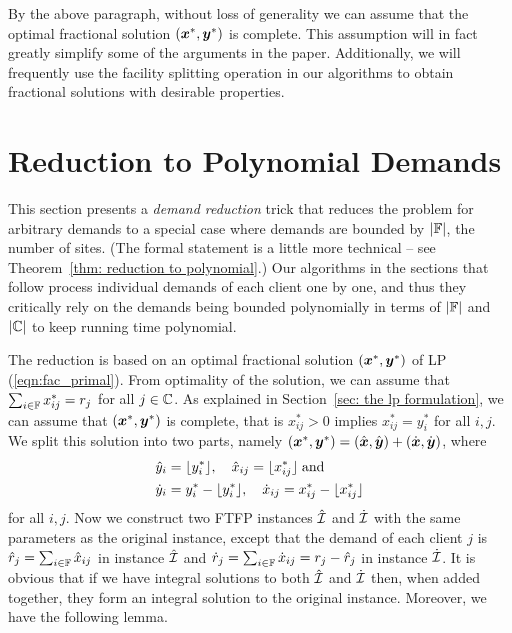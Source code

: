 \documentclass[11pt]{article}
\begin{document}
By the above paragraph,  without loss of generality we can
assume that the optimal fractional solution $(\boldsymbol{x}^\ast, \boldsymbol{y}^\ast)$
is complete. This assumption will in fact greatly simplify some of
the arguments in the paper. Additionally, we will frequently use the facility
splitting operation in our algorithms to obtain fractional solutions with
desirable properties.



\section{Reduction to Polynomial Demands}
\label{sec: polynomial demands}

This section presents a \emph{demand reduction} trick that
reduces the problem for arbitrary demands to a special case
where demands are bounded by $|\mathbb{F}|$, the number of
sites.  (The formal statement is a little more technical --
see Theorem~\ref{thm: reduction to polynomial}.)  Our
algorithms in the sections that follow process individual
demands of each client one by one, and thus they critically
rely on the demands being bounded polynomially in terms of
$|\mathbb{F}|$ and $|\mathbb{C}|$ to keep running time
polynomial.

The reduction is based on an optimal fractional solution
$(\boldsymbol{x}^\ast,\boldsymbol{y}^\ast)$ of LP (\ref{eqn:fac_primal}). From
optimality of the solution, we can assume that
$\sum_{i\in\mathbb{F}} x^\ast_{ij} = r_j$ for all
$j\in\mathbb{C}$.  As explained in Section~\ref{sec: the lp
  formulation}, we can assume that $(\boldsymbol{x}^\ast,\boldsymbol{y}^\ast)$
is complete, that is $x^\ast_{ij} > 0$ implies $x^\ast_{ij}
= y^\ast_i$ for all $i,j$.  We split this solution into two
parts, namely $(\boldsymbol{x}^\ast,\boldsymbol{y}^\ast) = (\hat{\boldsymbol{x}},\hat{\boldsymbol{y}})+
(\dot{\boldsymbol{x}},\dot{\boldsymbol{y}})$, where
%
\begin{align*}
{\hat y}_i &= { \lfloor y_i^\ast \rfloor }, \quad
			{\hat x}_{ij} = { \lfloor x_{ij}^\ast \rfloor } \;\textrm{and}
			\\
{\dot y}_i &= y_i^\ast - { \lfloor y_i^\ast \rfloor }, \quad
 	{\dot x}_{ij} = x_{ij}^\ast -  { \lfloor x_{ij}^\ast \rfloor }
\end{align*}
%
for all $i,j$. Now we construct two
FTFP instances ${\hat{\cal I}}$ and ${\dot{\cal I}}$ with the same
parameters as the original instance, except that the demand of each client $j$ is
${\hat r}_j = \sum_{i\in\mathbb{F}} {\hat x}_{ij}$ in instance ${\hat{\cal I}}$ and
${\dot r}_j = \sum_{i\in\mathbb{F}} {\dot x}_{ij} = r_j - {\hat r}_j$ in instance ${\dot{\cal I}}$. 
It is obvious that if we have integral solutions to both ${\hat{\cal I}}$
and ${\dot{\cal I}}$ then, when added together, they form an integral
solution to the original instance.  Moreover, we have the
following lemma.
\end{document}

